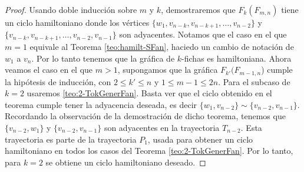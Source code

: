     \begin{proof}
        Usando doble inducci\'on sobre $m$ y $k$, demostraremos que
        $F_k(F_{m,n})$ tiene un ciclo hamiltoniano donde los v\'ertices $\{w_1,
        v_{n-k}, v_{n-k+1}, \dots, v_{n-2}\}$ y $\{v_{n-k}, v_{n-k+1}, \dots,
        v_{n-2}, v_{n-1}\}$ son adyacentes. Notamos que el caso en el que $m =1$
        equivale al Teorema \ref{teo:hamilt-SFan}, haciedo un cambio de
        notaci\'on de $w_1$ a $v_n$. Por lo tanto tenemos que la gr\'afica de
        $k$-fichas es hamiltoniana. Ahora veamos el caso en el que $m>1$,
        supongamos que la gr\'afica $F_{k'}(F_{m-1,n}$) cumple la hip\'otesis de
        inducci\'on, con $2\leq k'\leq n$ y $1 \leq m-1 \leq 2n$. Para el subcaso de
        $k=2$ usaremos \cref{teo:2-TokGenerFan}. Basta ver que el ciclo
        obtenido en el teorema cumple tener la adyacencia deseada, es decir
        $\{w_1, v_{n-2}\}\sim\{v_{n-2}, v_{n-1}\}$. Recordando la observaci\'on
        de la demostraci\'on de dicho teorema, tenemos que $\{v_{n-2},w_1\}$ y
        $\{v_{n-2},v_{n-1}\}$ son adyacentes en la trayectoria $T_{n-2}$. Esta
        trayectoria es parte de la trayectoria $P_1$, usada para obtener un
        ciclo hamiltoniano en todos los casos del Teorema
        \ref{teo:2-TokGenerFan}. Por lo tanto, para $k=2$ se obtiene un ciclo
        hamiltoniano deseado.


\end{proof}

